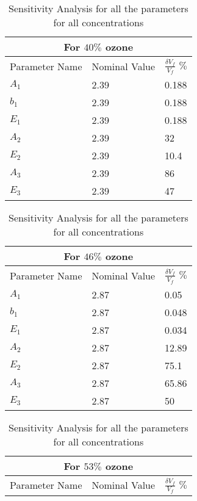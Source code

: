 \begin{table}[H]
\caption {Sensitivity Analysis for all the parameters for all concentrations} \label{tab:sensitivity-data}
\begin{center}

\begin{tabular}{ |p{3cm}|p{3cm}|p{3cm}|}
 \hline
 \multicolumn{3}{|c|}{For $40 \%$ ozone} \\
 \hline
 Parameter Name   & Nominal Value  & $\frac{\delta V_f}{V_f}$ $\%$ \\
 \hline
 $A_1$      &  2.39   &  0.188   \\
 $b_1$      &  2.39   &  0.188    \\
 $E_1$      &  2.39   &  0.188     \\
 $A_2$      &  2.39   &  32       \\       
 $E_2$      &  2.39   &   10.4    \\
 $A_3$      &  2.39   &   86    \\       
 $E_3$      &  2.39   &   47    \\
 \hline
\end{tabular}
\newline
\vspace*{0.7 cm}
\newline
\begin{tabular}{ |p{3cm}|p{3cm}|p{3cm}| }
 \hline
 \multicolumn{3}{|c|}{For $46 \%$ ozone} \\
 \hline
 Parameter Name   & Nominal Value  & $\frac{\delta V_f}{V_f}$ $\%$ \\
 \hline
    $A_1$      &  2.87   &  0.05   \\
    $b_1$      &  2.87   &  0.048    \\
    $E_1$      &  2.87   &  0.034     \\
    $A_2$      &  2.87   &  12.89       \\       
    $E_2$      &  2.87   &   75.1    \\
    $A_3$      &  2.87   &   65.86   \\       
    $E_3$      &  2.87   &   50   \\
   \hline
\end{tabular}
\newline
\vspace*{0.7 cm}
\newline
\begin{tabular}{ |p{3cm}|p{3cm}|p{3cm}| }
 \hline
 \multicolumn{3}{|c|}{For $53\%$ ozone} \\
 \hline
 Parameter Name   & Nominal Value  & $\frac{\delta V_f}{V_f}$ $\%$ \\

\end{tabular}
\end{center}
\end{table}
